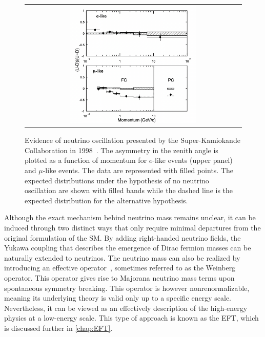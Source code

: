 \begin{figure}[tbh!]
 \begin{center}
 \begin{tabular}{c}
 \includegraphics[width=0.6\textwidth]{figures/Part1/BSM/SuperK}
 \end{tabular}
 \caption{Evidence of neutrino oscillation presented by the Super-Kamiokande Collaboration in 1998~\cite{Super-Kamiokande:1998kpq}. The asymmetry in the zenith angle is plotted as a function of momentum for $e$-like events (upper panel) and $\mu$-like events. The data are represented with filled points. The expected distributions under the hypothesis of no neutrino oscillation are shown with filled bands while the dashed line is the expected distribution for the alternative hypothesis.}
 \label{fig:SuperK}
 \end{center}
\end{figure}

Although the exact mechanism behind neutrino mass remains unclear, it can be induced through two distinct ways that only require minimal departures from the original formulation of the \ac{SM}. By adding right-handed neutrino fields, the Yukawa coupling \cite{Weinberg:1967tq} that describes the emergence of Dirac fermion masses can be naturally extended to neutrinos. The neutrino mass can also be realized by introducing an effective operator~\cite{Weinberg:1979sa}, sometimes referred to as the Weinberg operator. This operator gives rise to Majorana neutrino mass terms upon spontaneous symmetry breaking. This operator is however nonrenormalizable, meaning its underlying theory is valid only up to a specific energy scale. Nevertheless, it can be viewed as an effectively description of the high-energy physics at a low-energy scale. This type of approach is known as the \ac{EFT}, which is discussed further in \autoref{chap:EFT}.

